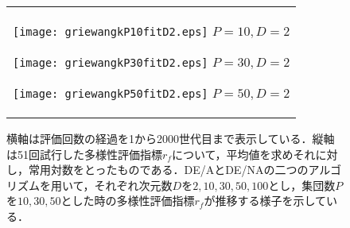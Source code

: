 \documentclass[a4paper,11pt,oneside,openany]{jsbook}
\begin{document}
\newpage
\begin{figure}[htbp]
  \caption{横軸は評価回数の経過を1から2000世代目まで表示している．縦軸は51回試行した多様性評価指標$r_f$について，平均値を求めそれに対し，常用対数をとったものである．DE/AとDE/NAの二つのアルゴリズムを用いて，それぞれ次元数$D$を$2,10,30,50,100$とし，集団数$P$を$10,30,50$とした時の多様性評価指標$r_f$が推移する様子を示している．}
  \begin{center}
    \begin{tabular}{c}


      \begin{minipage}{0.33\hsize}
        \begin{center}
          \texttt{[image: griewangkP10fitD2.eps]}
          \hspace{1.2cm}$P=10, D=2
 $       \end{center}
      \end{minipage}

      \begin{minipage}{0.33\hsize}
        \begin{center}
          \texttt{[image: griewangkP30fitD2.eps]}
          \hspace{1.2cm}$P=30, D=2
 $       \end{center}
      \end{minipage}

      \begin{minipage}{0.33\hsize}
        \begin{center}
          \texttt{[image: griewangkP50fitD2.eps]}
          \hspace{1.2cm}$P=50, D=2
 $       \end{center}
      \end{minipage}
    \end{tabular}
  \end{center}
\end{figure}
\end{document}
